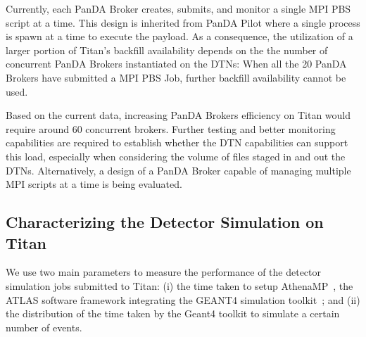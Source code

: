 Currently, each PanDA Broker creates, submits, and monitor a single MPI PBS
script at a time. This design is inherited from PanDA Pilot where a single
process is spawn at a time to execute the payload. As a consequence, the
utilization of a larger portion of Titan's backfill availability depends on the
the number of concurrent PanDA Brokers instantiated on the DTNs: When all the 20
PanDA Brokers have submitted a MPI PBS Job, further backfill availability cannot
be used.

Based on the current data, increasing PanDA Brokers efficiency on Titan would
require around 60 concurrent brokers. Further testing and better monitoring
capabilities are required to establish whether the DTN capabilities can support
this load, especially when considering the volume of files staged in and out the
DTNs. Alternatively, a design of a PanDA Broker capable of managing multiple MPI
scripts at a time is being evaluated.



\subsection{Characterizing the Detector Simulation on Titan}
\label{ssec:panda_titan}


We use two main parameters to measure the performance of the detector simulation
jobs submitted to Titan: (i) the time taken to setup
AthenaMP~\cite{aad2010atlas}, the ATLAS software framework integrating the
GEANT4 simulation toolkit~\cite{agostinelli2003geant4}; and (ii) the
distribution of the time taken by the Geant4 toolkit to simulate a certain
number of events.

